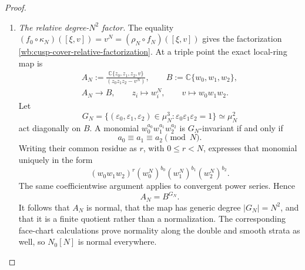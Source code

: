 \begin{proof}
\begin{enumerate}[label=\arabic*.,leftmargin=*]
\item \medskip\noindent
\emph{The relative degree-$N^2$ factor.}
The equality
\((f_0\circ\kappa_N)([\xi,v])=v^N=(\rho_N\circ f_N)([\xi,v])\)
gives the factorization
\eqref{wb:cusp-cover-relative-factorization}.  At a triple point the exact
local-ring map is
\begin{equation}
 \begin{gathered}
 A_N:=
 \frac{\mathbb C\{z_0,z_1,z_2,v\}}
      {(z_0z_1z_2-v^N)},
 \qquad
 B:=\mathbb C\{w_0,w_1,w_2\},\\
 A_N\longrightarrow B,\qquad
 z_i\longmapsto w_i^N,\qquad
 v\longmapsto w_0w_1w_2.
 \end{gathered}
 \label{wb:cusp-cover-basechange-local-ring}
\end{equation}
Let
\[
 G_N=\{(\varepsilon_0,\varepsilon_1,\varepsilon_2)\in\mu_N^3:
       \varepsilon_0\varepsilon_1\varepsilon_2=1\}
 \simeq\mu_N^2
\]
act diagonally on $B$.  A monomial
$w_0^{a_0}w_1^{a_1}w_2^{a_2}$ is $G_N$-invariant if and only if
\[
 a_0\equiv a_1\equiv a_2\pmod N.
\]
Writing their common residue as $r$, with $0\le r<N$, expresses that
monomial uniquely in the form
\[
 (w_0w_1w_2)^r
 (w_0^N)^{b_0}(w_1^N)^{b_1}(w_2^N)^{b_2}.
\]
The same coefficientwise argument applies to convergent power series.
Hence
\begin{equation}
 A_N=B^{G_N}.
 \label{wb:cusp-cover-invariant-ring}
\end{equation}
It follows that $A_N$ is normal, that the map has generic degree
$|G_N|=N^2$, and that it is a finite quotient rather than a normalization.
The corresponding face-chart calculations prove normality along the
double and smooth strata as well, so $N_0[N]$ is normal everywhere.


\end{enumerate}
\end{proof}
